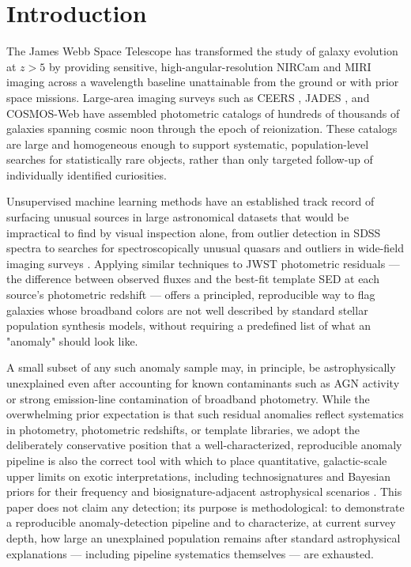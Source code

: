 \documentclass[twocolumn]{aastex631}
\begin{document}

\section{Introduction}
\label{sec:intro}

The James Webb Space Telescope has transformed the study of galaxy
evolution at $z > 5$ by providing sensitive, high-angular-resolution NIRCam
\citep{Rieke2023} and MIRI imaging across a wavelength baseline
unattainable from the ground or with prior space missions. Large-area
imaging surveys such as CEERS \citep{Finkelstein2023}, JADES
\citep{Eisenstein2023}, and COSMOS-Web \citep{Casey2023} have assembled
photometric catalogs of hundreds of thousands of galaxies spanning cosmic
noon through the epoch of reionization. These catalogs are large and
homogeneous enough to support systematic, population-level searches for
statistically rare objects, rather than only targeted follow-up of
individually identified curiosities.

Unsupervised machine learning methods have an established track record of
surfacing unusual sources in large astronomical datasets that would be
impractical to find by visual inspection alone, from outlier detection in
SDSS spectra \citep{BaronPoznanski2017} to searches for spectroscopically
unusual quasars \citep{Meusinger2012} and outliers in wide-field imaging
surveys \citep{Liang2023}. Applying similar techniques to JWST photometric
residuals --- the difference between observed fluxes and the best-fit
template SED at each source's photometric redshift --- offers a
principled, reproducible way to flag galaxies whose broadband colors are
not well described by standard stellar population synthesis models,
without requiring a predefined list of what an "anomaly" should look like.

A small subset of any such anomaly sample may, in principle, be
astrophysically unexplained even after accounting for known contaminants
such as AGN activity or strong emission-line contamination of broadband
photometry. While the overwhelming prior expectation is that such residual
anomalies reflect systematics in photometry, photometric redshifts, or
template libraries, we adopt the deliberately conservative position that a
well-characterized, reproducible anomaly pipeline is also the correct tool
with which to place quantitative, galactic-scale upper limits on exotic
interpretations, including technosignatures and Bayesian priors for their
frequency \citep{Wright2014, Lacki2016} and biosignature-adjacent
astrophysical scenarios \citep{LingamLoeb2019}. This paper does not claim
any detection; its purpose is methodological: to demonstrate a reproducible
anomaly-detection pipeline and to characterize, at current survey depth,
how large an unexplained population remains after standard astrophysical
explanations --- including pipeline systematics themselves --- are
exhausted.
\end{document}
